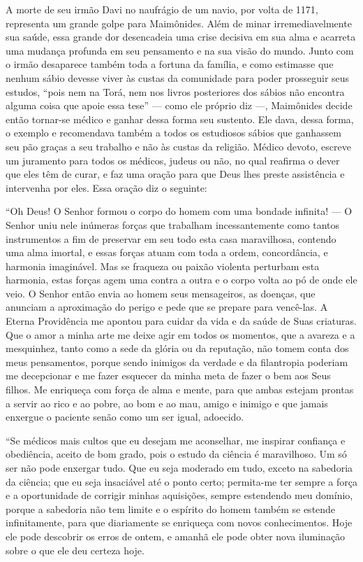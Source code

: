 A morte de seu irmão Davi no naufrágio de um navio, por volta de 1171,
representa um grande golpe para Maimônides. Além de minar
irremediavelmente sua saúde, essa grande dor desencadeia uma crise
decisiva em sua alma e acarreta uma mudança profunda em seu pensamento
e na sua visão do mundo. Junto com o irmão desaparece também
toda a fortuna da família, e
como estimasse que nenhum sábio devesse viver às custas da comunidade
para poder prosseguir seus estudos, ``pois nem na Torá, nem nos
livros posteriores dos sábios não encontra alguma coisa que apoie essa
tese'' --- como ele próprio diz ---, Maimônides decide então tornar-se
médico e ganhar dessa forma seu sustento. Ele dava, dessa forma, o
exemplo e recomendava também a todos os estudiosos sábios que ganhassem
seu pão graças a seu trabalho e não às custas da religião. Médico
devoto, escreve um juramento para todos os médicos, judeus ou não, no
qual reafirma o dever que eles têm de curar, e faz uma oração para que
Deus lhes preste assistência e intervenha por eles. Essa oração diz o
seguinte:

``Oh Deus! O Senhor formou o corpo do homem com uma bondade infinita!
--- O Senhor uniu nele inúmeras forças que trabalham incessantemente
como tantos instrumentos a fim de preservar em seu todo esta casa
maravilhosa, contendo uma alma imortal, e essas forças atuam com toda a
ordem, concordância, e harmonia imaginável. Mas se fraqueza ou paixão
violenta perturbam esta harmonia, estas forças agem uma contra a outra
e o corpo volta ao pó de onde ele veio. O Senhor então envia ao homem
seus mensageiros, as doenças, que anunciam a aproximação do perigo e
pede que se prepare para vencê-las. A Eterna Providência me apontou para
cuidar da vida e da saúde de Suas criaturas. Que o amor a minha arte me
deixe agir em todos os momentos, que a avareza e a mesquinhez, tanto
como a sede da glória ou da reputação, não tomem conta dos meus
pensamentos, porque sendo inimigos da verdade e da filantropia poderiam
me decepcionar e me fazer esquecer da minha meta de fazer o bem aos Seus
filhos. Me enriqueça com força de alma e mente, para que ambas estejam
prontas a servir ao rico e ao pobre, ao bom e ao mau, amigo e inimigo e
que jamais enxergue o paciente senão como um ser igual, adoecido.

``Se médicos mais cultos que eu desejam me aconselhar, me inspirar
confiança e obediência, aceito de bom grado, pois o estudo da ciência é
maravilhoso. Um só ser não pode enxergar tudo. Que eu seja moderado em
tudo, exceto na sabedoria da ciência; que eu seja insaciável até o ponto
certo; permita-me ter sempre a força e a oportunidade de corrigir
minhas aquisições, sempre estendendo meu domínio, porque a sabedoria
não tem limite e o espírito do homem também se estende infinitamente,
para que diariamente se enriqueça com novos conhecimentos. Hoje ele
pode descobrir os erros de ontem, e amanhã ele pode obter nova
iluminação sobre o que ele deu certeza hoje.

